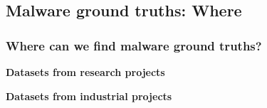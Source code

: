 \subsection[Where]{Malware ground truths: Where}

\begin{frame}
    \frametitle{Where can we find malware ground truths?}

    \begin{block}{}
        \centering
        \textbf{Datasets from research projects}
    \end{block}
    \vspace{-15pt}
    \begin{table}[t]
        \resizebox{\textwidth}{!}{
            
        }
    \end{table}

    \begin{block}{}
        \centering
        \textbf{Datasets from industrial projects}
    \end{block}
    \begin{table}[t]
        \resizebox{\textwidth}{!}{
            
        }
    \end{table}

\end{frame}
